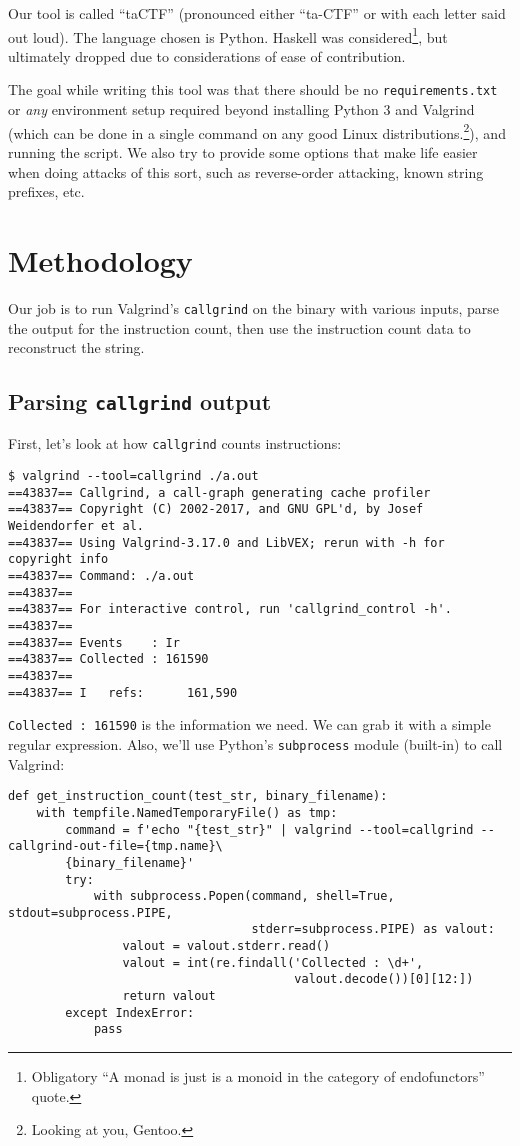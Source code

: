 \documentclass[11pt]{article}
\begin{document}
Our tool is called ``taCTF'' (pronounced either ``ta-CTF'' or with each
letter said out loud). The language chosen is Python. Haskell was
considered\footnote{Obligatory ``A monad is just is a monoid in the category of endofunctors'' quote.}, but ultimately dropped due to considerations of ease of
contribution.

The goal while writing this tool was that there should be no
\texttt{requirements.txt} or \emph{any} environment setup required beyond
installing Python 3 and Valgrind (which can be done in a single
command on any good Linux distributions.\footnote{Looking at you, Gentoo.}), and running the
script. We also try to provide some options that make life easier when
doing attacks of this sort, such as reverse-order attacking, known
string prefixes, etc.

\section{Methodology}
\label{sec:org186d130}

Our job is to run Valgrind's \texttt{callgrind} on the binary with various
inputs, parse the output for the instruction count, then use the
instruction count data to reconstruct the string.

\subsection{Parsing \texttt{callgrind} output}
\label{sec:orgac3a7b6}

First, let's look at how \texttt{callgrind} counts instructions:

\begin{verbatim}
$ valgrind --tool=callgrind ./a.out
==43837== Callgrind, a call-graph generating cache profiler
==43837== Copyright (C) 2002-2017, and GNU GPL'd, by Josef Weidendorfer et al.
==43837== Using Valgrind-3.17.0 and LibVEX; rerun with -h for copyright info
==43837== Command: ./a.out
==43837==
==43837== For interactive control, run 'callgrind_control -h'.
==43837==
==43837== Events    : Ir
==43837== Collected : 161590
==43837==
==43837== I   refs:      161,590
\end{verbatim}

\texttt{Collected : 161590} is the information we need. We can grab it with a
simple regular expression. Also, we'll use Python's \texttt{subprocess}
module (built-in) to call Valgrind:
\begin{verbatim}
def get_instruction_count(test_str, binary_filename):
    with tempfile.NamedTemporaryFile() as tmp:
        command = f'echo "{test_str}" | valgrind --tool=callgrind --callgrind-out-file={tmp.name}\
        {binary_filename}'
        try:
            with subprocess.Popen(command, shell=True, stdout=subprocess.PIPE,
                                  stderr=subprocess.PIPE) as valout:
                valout = valout.stderr.read()
                valout = int(re.findall('Collected : \d+',
                                        valout.decode())[0][12:])
                return valout
        except IndexError:
            pass
\end{verbatim}
\end{document}
